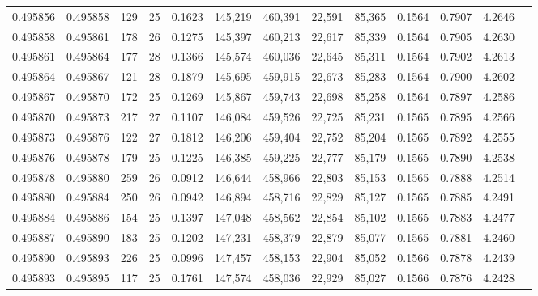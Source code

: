 \begin{tabular}{rrrrrrrrrrrrr}
0.495856 & 0.495858 & 129 &  25 &                                     0.1623 & 145,219 & 460,391 &  22,591 &  85,365 & 0.1564 & 0.7907 & 4.2646 \\
0.495858 & 0.495861 & 178 &  26 &                                     0.1275 & 145,397 & 460,213 &  22,617 &  85,339 & 0.1564 & 0.7905 & 4.2630 \\
0.495861 & 0.495864 & 177 &  28 &                                     0.1366 & 145,574 & 460,036 &  22,645 &  85,311 & 0.1564 & 0.7902 & 4.2613 \\
0.495864 & 0.495867 & 121 &  28 &                                     0.1879 & 145,695 & 459,915 &  22,673 &  85,283 & 0.1564 & 0.7900 & 4.2602 \\
0.495867 & 0.495870 & 172 &  25 &                                     0.1269 & 145,867 & 459,743 &  22,698 &  85,258 & 0.1564 & 0.7897 & 4.2586 \\
0.495870 & 0.495873 & 217 &  27 &                                     0.1107 & 146,084 & 459,526 &  22,725 &  85,231 & 0.1565 & 0.7895 & 4.2566 \\
0.495873 & 0.495876 & 122 &  27 &                                     0.1812 & 146,206 & 459,404 &  22,752 &  85,204 & 0.1565 & 0.7892 & 4.2555 \\
0.495876 & 0.495878 & 179 &  25 &                                     0.1225 & 146,385 & 459,225 &  22,777 &  85,179 & 0.1565 & 0.7890 & 4.2538 \\
0.495878 & 0.495880 & 259 &  26 &                                     0.0912 & 146,644 & 458,966 &  22,803 &  85,153 & 0.1565 & 0.7888 & 4.2514 \\
0.495880 & 0.495884 & 250 &  26 &                                     0.0942 & 146,894 & 458,716 &  22,829 &  85,127 & 0.1565 & 0.7885 & 4.2491 \\
0.495884 & 0.495886 & 154 &  25 &                                     0.1397 & 147,048 & 458,562 &  22,854 &  85,102 & 0.1565 & 0.7883 & 4.2477 \\
0.495887 & 0.495890 & 183 &  25 &                                     0.1202 & 147,231 & 458,379 &  22,879 &  85,077 & 0.1565 & 0.7881 & 4.2460 \\
0.495890 & 0.495893 & 226 &  25 &                                     0.0996 & 147,457 & 458,153 &  22,904 &  85,052 & 0.1566 & 0.7878 & 4.2439 \\
0.495893 & 0.495895 & 117 &  25 &                                     0.1761 & 147,574 & 458,036 &  22,929 &  85,027 & 0.1566 & 0.7876 & 4.2428 \\

\end{tabular}
